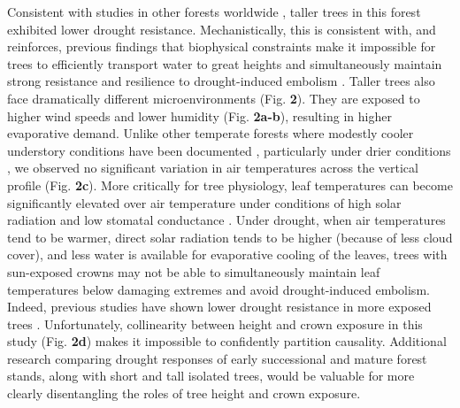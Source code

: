 \documentclass[
]{article}
\begin{document}
Consistent with studies in other forests worldwide
\citep{bennett_larger_2015}, taller trees in this forest exhibited lower
drought resistance. Mechanistically, this is consistent with, and
reinforces, previous findings that biophysical constraints make it
impossible for trees to efficiently transport water to great heights and
simultaneously maintain strong resistance and resilience to
drought-induced embolism
\citep{olson_plant_2018, couvreur_water_2018, roskilly_conflicting_2019}.
Taller trees also face dramatically different microenvironments (Fig.
\textbf{2}). They are exposed to higher wind speeds and lower humidity
(Fig. \textbf{2a-b}), resulting in higher evaporative demand. Unlike
other temperate forests where modestly cooler understory conditions have
been documented \citep{zellweger_seasonal_2019}, particularly under
drier conditions \citep{davis_microclimatic_2019}, we observed no
significant variation in air temperatures across the vertical profile
(Fig. \textbf{2c}). More critically for tree physiology, leaf
temperatures can become significantly elevated over air temperature
under conditions of high solar radiation and low stomatal conductance
\citep{campbell_introduction_1998, rey-sanchez_spatial_2016}. Under
drought, when air temperatures tend to be warmer, direct solar radiation
tends to be higher (because of less cloud cover), and less water is
available for evaporative cooling of the leaves, trees with sun-exposed
crowns may not be able to simultaneously maintain leaf temperatures
below damaging extremes and avoid drought-induced embolism. Indeed,
previous studies have shown lower drought resistance in more exposed
trees
\citep{liu_effect_1993, suarez_factors_2004, scharnweber_confessions_2019}.
Unfortunately, collinearity between height and crown exposure in this
study (Fig. \textbf{2d}) makes it impossible to confidently partition
causality. Additional research comparing drought responses of early
successional and mature forest stands, along with short and tall
isolated trees, would be valuable for more clearly disentangling the
roles of tree height and crown exposure.
\end{document}
